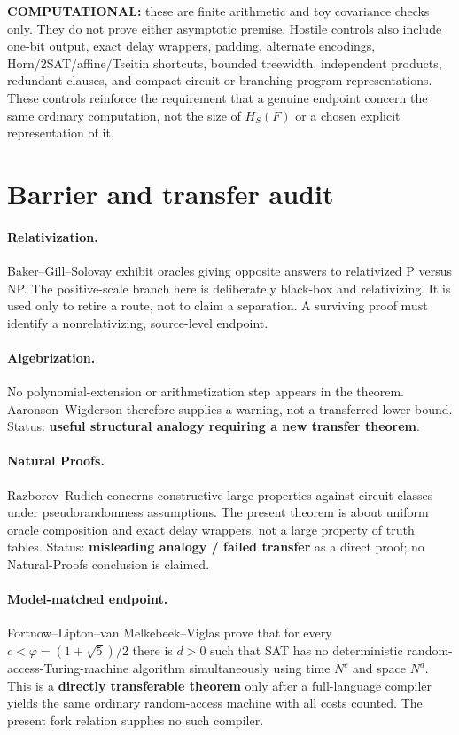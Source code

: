 \documentclass[11pt]{article}
\begin{document}
\noindent
\textbf{COMPUTATIONAL:} these are finite arithmetic and toy covariance
checks only.  They do not prove either asymptotic premise.  Hostile controls
also include one-bit output, exact delay wrappers, padding, alternate
encodings, Horn/2SAT/affine/Tseitin shortcuts, bounded treewidth, independent
products, redundant clauses, and compact circuit or branching-program
representations.  These controls reinforce the requirement that a genuine
endpoint concern the same ordinary computation, not the size of $H_S(F)$ or
a chosen explicit representation of it.

\section{Barrier and transfer audit}

\paragraph{Relativization.}
Baker--Gill--Solovay exhibit oracles giving opposite answers to relativized
P versus NP.  The positive-scale branch here is deliberately black-box and
relativizing.  It is used only to retire a route, not to claim a separation.
A surviving proof must identify a nonrelativizing, source-level endpoint.

\paragraph{Algebrization.}
No polynomial-extension or arithmetization step appears in the theorem.
Aaronson--Wigderson therefore supplies a warning, not a transferred lower
bound.  Status: \textbf{useful structural analogy requiring a new transfer
theorem}.

\paragraph{Natural Proofs.}
Razborov--Rudich concerns constructive large properties against circuit
classes under pseudorandomness assumptions.  The present theorem is about
uniform oracle composition and exact delay wrappers, not a large property
of truth tables.  Status: \textbf{misleading analogy / failed transfer} as a
direct proof; no Natural-Proofs conclusion is claimed.

\paragraph{Model-matched endpoint.}
Fortnow--Lipton--van Melkebeek--Viglas prove that for every
$c<\varphi=(1+\sqrt5)/2$ there is $d>0$ such that SAT has no deterministic
random-access-Turing-machine algorithm simultaneously using time $N^c$ and
space $N^d$.  This is a \textbf{directly transferable theorem} only after a
full-language compiler yields the same ordinary random-access machine with
all costs counted.  The present fork relation supplies no such compiler.
\end{document}
